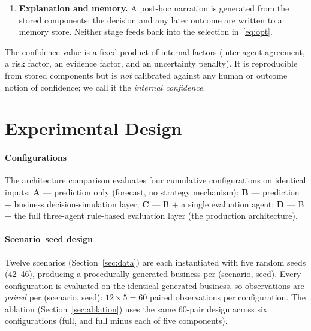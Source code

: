 \documentclass[conference]{IEEEtran}
\newcommand{\code}[1]{\texttt{#1}}
\begin{document}
\begin{enumerate}
\begin{equation}
s \;=\; \frac{\mathrm{BA} + \mathrm{FA}}{2} \;-\; \lambda\,(1 - \mathrm{RM}),
\label{eq:opt}
\end{equation}
where $\mathrm{BA},\mathrm{FA},\mathrm{RM}\in[0,1]$ are the business-analyst,
financial-advisor, and risk-manager scores and $\lambda$ is the risk-penalty
weight. The production configuration (denoted \textbf{D0}) uses $\lambda=1$ and
no learned risk model (\code{risk\_model = None}), abbreviated \textbf{R0/D0}.
\item \textbf{Explanation and memory.} A post-hoc narration is generated from
the stored components; the decision and any later outcome are written to a
memory store. Neither stage feeds back into the selection
in~\eqref{eq:opt}.
\end{enumerate}

The confidence value is a fixed product of internal factors (inter-agent
agreement, a risk factor, an evidence factor, and an uncertainty penalty). It is
reproducible from stored components but is \emph{not} calibrated against any
human or outcome notion of confidence; we call it the \emph{internal confidence}.

\section{Experimental Design}
\label{sec:design}

\paragraph{Configurations}
The architecture comparison evaluates four cumulative configurations on
identical inputs: \textbf{A} --- prediction only (forecast, no strategy
mechanism); \textbf{B} --- prediction $+$ business decision-simulation layer;
\textbf{C} --- B $+$ a single evaluation agent; \textbf{D} --- B $+$ the full
three-agent rule-based evaluation layer (the production architecture).

\paragraph{Scenario--seed design}
Twelve scenarios (Section~\ref{sec:data}) are each instantiated with five random
seeds (42--46), producing a procedurally generated business per (scenario,
seed). Every configuration is evaluated on the identical generated business, so
observations are \emph{paired} per (scenario, seed): $12\times 5 = 60$ paired
observations per configuration. The ablation (Section~\ref{sec:ablation}) uses
the same 60-pair design across six configurations (full, and full minus each of
five components).
\end{document}

